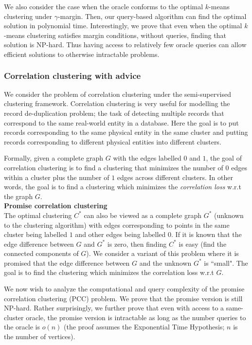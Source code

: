 \documentclass[12pt]{article}
\begin{document}
We also consider the case when the oracle conforms to the optimal $k$-means clustering under $\gamma$-margin. Then, our query-based algorithm can find the optimal solution in polynomial time. Interestingly, we prove that even when the optimal $k$-means clustering satisfies margin conditions, without queries, finding that solution is NP-hard. Thus having access to relatively few oracle queries can allow efficient solutions to otherwise intractable problems.

\subsubsection*{Correlation clustering with advice}
We consider the problem of correlation clustering under the semi-supervised clustering framework. Correlation clustering is very useful for modelling the record de-duplication problem; the task of detecting multiple records that correspond to the same real-world entity in a database. Here the goal is to put records corresponding to the same physical entity in the same cluster and putting records corresponding to different physical entities into different clusters.

Formally, given a complete graph $G$ with the edges labelled $0$ and $1$, the goal of correlation clustering is to find a clustering that minimizes the number of $0$ edges within a cluster plus the number of $1$ edges across different clusters. In other words, the goal is to find a clustering which minimizes the \textit{correlation loss} w.r.t the graph $G$. \\

\noindent\textbf{\small Promise correlation clustering}\\
The optimal clustering $C^*$ can also be viewed as a complete graph $G^*$ (unknown to the clustering algorithm) with edges corresponding to points in the same cluster being labelled $1$ and other edges being labelled $0$. If it is known that the edge difference between $G$ and $G^*$ is zero, then finding $C^*$ is easy (find the connected components of $G$). We consider a variant of this problem where it is promised that the edge difference between $G$ and the unknown $G^*$ is ``small". The goal is to find the clustering which minimizes the correlation loss w.r.t $G$.

We now wish to analyze the computational and query complexity of the promise correlation clustering (PCC) problem. We prove that the promise version is still NP-hard. Rather surprisingly, we further prove that even with access to a same-cluster oracle, the promise version is intractable as long as the number queries to the oracle is $o(n)$ (the proof assumes the Exponential Time Hypothesis; $n$ is the number of vertices). \\
\end{document}
